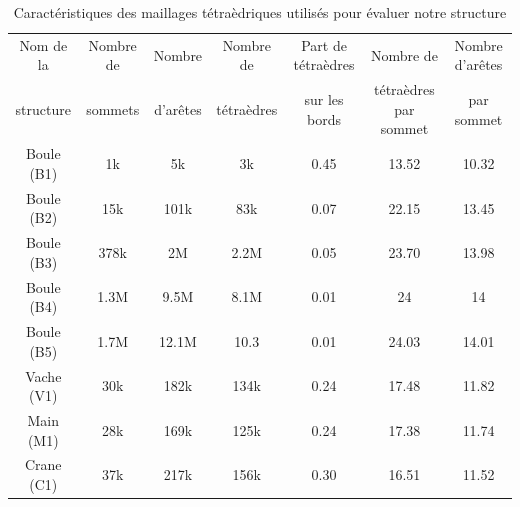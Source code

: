 \begin{table}[H]
\footnotesize
\begin{tabular}{|c | c | c | c | c| c | c |}
\hline
Nom de la & Nombre de & Nombre& Nombre de & Part de tétraèdres & Nombre de & Nombre d'arêtes\\
structure&sommets&d'arêtes &tétraèdres&sur les bords&tétraèdres par sommet & par sommet\\
\hline
Boule (B1) & 1k & 5k & 3k & 0.45 & 13.52 & 10.32 \\
Boule (B2)& 15k & 101k & 83k & 0.07 & 22.15 & 13.45\\
Boule (B3)& 378k & 2M & 2.2M & 0.05 & 23.70 & 13.98 \\
Boule (B4)& 1.3M & 9.5M & 8.1M & 0.01 & 24 & 14 \\
Boule (B5)& 1.7M & 12.1M & 10.3 & 0.01  & 24.03  & 14.01  \\
Vache (V1)& 30k & 182k & 134k & 0.24 & 17.48 & 11.82 \\
Main (M1)& 28k & 169k & 125k & 0.24 & 17.38 & 11.74\\
Crane (C1)& 37k & 217k & 156k & 0.30 & 16.51 & 11.52 \\ 
\hline  
\end{tabular}
\caption{Caractéristiques des maillages tétraèdriques utilisés pour évaluer notre structure}
\label{tab:caract_maillages}
\end{table}

